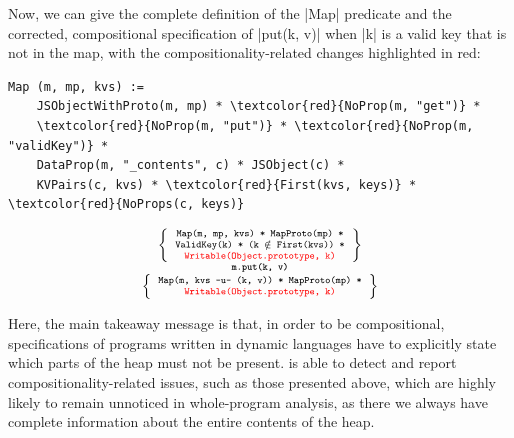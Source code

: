 Now, we can give the complete definition of the \jsinline|Map| predicate and the corrected, compositional specification of \jsinline|put(k, v)| when \jsinline|k| is a valid key that is not in the map, with the compositionality-related changes highlighted in red:

\noindent
\begin{minipage}{0.58\textwidth}
\begin{Verbatim}[fontsize=\footnotesize,commandchars=\\\{\}]
  Map (m, mp, kvs) := 
    JSObjectWithProto(m, mp) * \textcolor{red}{NoProp(m, "get")} * 
    \textcolor{red}{NoProp(m, "put")} * \textcolor{red}{NoProp(m, "validKey")} * 
    DataProp(m, "_contents", c) * JSObject(c) *
    KVPairs(c, kvs) * \textcolor{red}{First(kvs, keys)} * \textcolor{red}{NoProps(c, keys)}
\end{Verbatim} 
\end{minipage}
\begin{minipage}{0.42\textwidth}
%
\begin{displaymath} 
{\scriptsize
\begin{array}{c}
\left\{ {\begin{array}{c}
 \text{\texttt{Map(m, mp, kvs) * MapProto(mp) *}} \\
 \text{\texttt{ValidKey(k) * (k $\notin$ First(kvs)) *}} \\
 \text{\textcolor{red}{\texttt{Writable(Object.prototype, k)}}}
\end{array}} \right\} \\
%
\text{\bfseries \texttt{m.put(k, v)}} \\[0.2mm]
%
\left\{ {\begin{array}{c}
 \text{\texttt{Map(m, kvs -u- (k, v)) * MapProto(mp) *}} \\
 \text{\textcolor{red}{\texttt{Writable(Object.prototype, k)}}} \\
\end{array}} \right\}
\end{array}
} 
\end{displaymath}
\end{minipage}

\medskip
Here, the main takeaway message is that, in order to be compositional, specifications of programs written in dynamic languages have to explicitly state which parts of the heap must not be present. \cosette is able to detect and report compositionality-related issues, such as those presented above, which are highly likely to remain unnoticed in whole-program analysis, as there we always have complete information about the entire contents of the heap.


